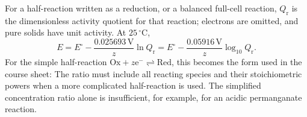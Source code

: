 \documentclass[a4paper,10pt]{article}
\newcommand{\chemunit}[1]{\,\mathrm{#1}}
\newcommand{\chapterbreak}{\clearpage}
\begin{document}
For a half-reaction written as a reduction, or a balanced full-cell reaction,
$Q_{\mathrm r}$ is the dimensionless activity quotient for that reaction;
electrons are omitted, and pure solids have unit activity.
At $25\,^{\circ}\mathrm C$,
\[
 E=E^\circ-\frac{0.025693\chemunit V}{z}\ln Q_{\mathrm r}
  =E^\circ-\frac{0.05916\chemunit V}{z}\log_{10}Q_{\mathrm r}.
\]
For the simple half-reaction $\mathrm{Ox}+z\mathrm e^-\rightleftharpoons\mathrm{Red}$,
this becomes the form used in the course sheet:
The ratio must include all reacting species and their stoichiometric powers
when a more complicated half-reaction is used. The simplified concentration
ratio alone is insufficient, for example, for an acidic permanganate reaction.

\chapterbreak
\end{document}
